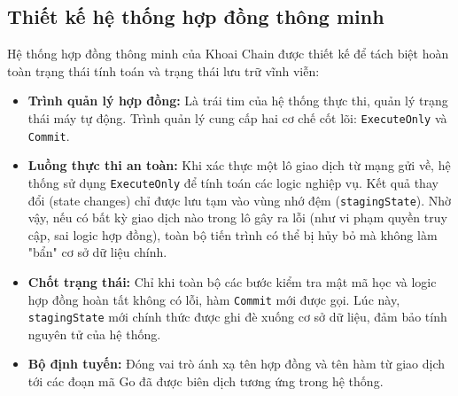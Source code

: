 \documentclass[12pt,a4paper]{article}
\begin{document}
\subsection{Thiết kế hệ thống hợp đồng thông minh}
Hệ thống hợp đồng thông minh của Khoai Chain được thiết kế để tách biệt hoàn toàn trạng thái tính toán và trạng thái lưu trữ vĩnh viễn:
\begin{itemize}
    \item \textbf{Trình quản lý hợp đồng:} Là trái tim của hệ thống thực thi, quản lý trạng thái máy tự động. Trình quản lý cung cấp hai cơ chế cốt lõi: \texttt{ExecuteOnly} và \texttt{Commit}. 
    \item \textbf{Luồng thực thi an toàn:} Khi xác thực một lô giao dịch từ mạng gửi về, hệ thống sử dụng \texttt{ExecuteOnly} để tính toán các logic nghiệp vụ. Kết quả thay đổi (state changes) chỉ được lưu tạm vào vùng nhớ đệm (\texttt{stagingState}). Nhờ vậy, nếu có bất kỳ giao dịch nào trong lô gây ra lỗi (như vi phạm quyền truy cập, sai logic hợp đồng), toàn bộ tiến trình có thể bị hủy bỏ mà không làm "bẩn" cơ sở dữ liệu chính.
    \item \textbf{Chốt trạng thái:} Chỉ khi toàn bộ các bước kiểm tra mật mã học và logic hợp đồng hoàn tất không có lỗi, hàm \texttt{Commit} mới được gọi. Lúc này, \texttt{stagingState} mới chính thức được ghi đè xuống cơ sở dữ liệu, đảm bảo tính nguyên tử của hệ thống.
    \item \textbf{Bộ định tuyến:} Đóng vai trò ánh xạ tên hợp đồng và tên hàm từ giao dịch tới các đoạn mã Go đã được biên dịch tương ứng trong hệ thống.
\end{itemize}
\end{document}

